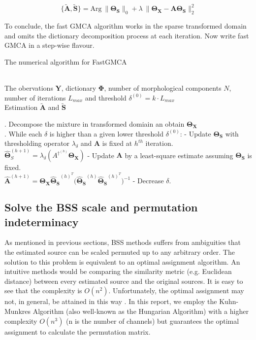 \begin{equation}
    \{\mathbf{\tilde{A},\tilde{S}}\} = \text{Arg} \: 
    \lVert \mathbf{\Theta_S} \rVert_0 + \lambda \:\lVert \mathbf{\Theta_X} - \mathbf{A\Theta_S} \rVert^2_2
\label{fast-gmca}
\end{equation}

To conclude, the fast GMCA algorithm works in the sparse transformed domain and omits the dictionary decomposition process at each iteration. Now write fast GMCA in a step-wise flavour.

\begin{algorithm}[!htbp] 
\caption{The numerical algorithm for FastGMCA}
\label{alg:Framwork} 
\begin{algorithmic}
\REQUIRE ~~\\%
The obervations $\mathbf{Y}$, dictionary $\mathbf{\Phi}$, number of morphological components $N$, number of iterations $L_{max}$ and threshold $\delta^{(0)} = k \cdot L_{max}$
\ENSURE ~~\\ %
Estimation $\tilde{\mathbf{A}}$ and $\tilde{\mathbf{S}}$

. Decompose the mixture in transformed domiain an obtain $\mathbf{\Theta_X}$\\

. While each $\delta$ is higher than a given lower threshold $\delta^{(0)}$:
\STATE \quad - Update $\mathbf{\Theta_S}$ with thresholding operator $\lambda_{\delta}$ and $\mathbf{A}$ is fixed at $h^{th}$ iteration.\\
\quad \quad $\mathbf{\hat{\Theta}}^{(h+1)}_S = \lambda_{\delta} (A^{\dagger^{(h)}}\mathbf{\Theta_X})$
\STATE \quad - Update $\mathbf{A}$ by a least-square estimate assuming $\mathbf{\Theta_S}$ is fixed.\\
\quad \quad $\mathbf{\hat{A}}^{(h+1)} = \mathbf{\Theta_X} \mathbf{\hat{\Theta}_S}^{(h)^T} 
\mathbf{(\hat{\Theta}_S}^{(h)} \mathbf{\hat{\Theta}_S}^{(h)^T})^{-1}$
\STATE \quad - Decrease $\delta$.
\end{algorithmic}
\end{algorithm}


\subsection{Solve the BSS scale and permutation indeterminacy}
As mentioned in previous sections, BSS methods suffers from ambiguities that the estimated source can be scaled permuted up to any arbitrary order. The solution to this problem is equivalent to an optimal assignment algorithm. An intuitive methods would be comparing the similarity metric (e.g. Euclidean distance) between every estimated source and the original sources. It is easy to see that the complexity is $O(n^2)$. Unfortunately, the optimal assignment may not, in general, be attained in this way \cite{1261953}. In this report, we employ the Kuhn-Munkres Algorithm (also well-known as the Hungarian Algorithm)
with a higher complexity $O(n^3)$ (n is the number of channels) but guarantees the optimal assignment to calculate the permutation matrix.

